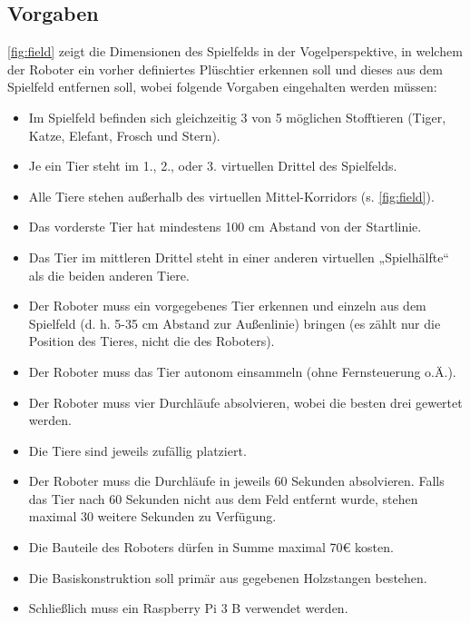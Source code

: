 \subsection{Vorgaben}


\autoref{fig:field} zeigt die Dimensionen des Spielfelds in der Vogelperspektive, in welchem der Roboter ein vorher definiertes Plüschtier erkennen soll und dieses aus dem Spielfeld entfernen soll, wobei folgende Vorgaben eingehalten werden müssen:

\begin{itemize}
    \item Im Spielfeld befinden sich gleichzeitig 3 von 5 möglichen Stofftieren (Tiger, Katze, Elefant, Frosch und Stern).
    \item Je ein Tier steht im 1., 2., oder 3. virtuellen Drittel des Spielfelds.
    \item Alle Tiere stehen außerhalb des virtuellen Mittel-Korridors (s. \autoref{fig:field}).
    \item Das vorderste Tier hat mindestens 100 cm Abstand von der Startlinie.
    \item Das Tier im mittleren Drittel steht in einer anderen virtuellen „Spielhälfte“ als die beiden anderen Tiere.
    \item Der Roboter muss ein vorgegebenes Tier erkennen und einzeln aus dem Spielfeld (d. h. 5-35 cm Abstand zur Außenlinie) bringen (es zählt nur die Position des Tieres, nicht die des Roboters).
    \item Der Roboter muss das Tier autonom einsammeln (ohne Fernsteuerung o.Ä.).
    \item Der Roboter muss vier Durchläufe absolvieren, wobei die besten drei gewertet werden.
    \item Die Tiere sind jeweils zufällig platziert.
    \item Der Roboter muss die Durchläufe in jeweils 60 Sekunden absolvieren. Falls das Tier nach 60 Sekunden nicht aus dem Feld entfernt wurde, stehen maximal 30 weitere Sekunden zu Verfügung.
    \item Die Bauteile des Roboters dürfen in Summe maximal 70€ kosten.
    \item Die Basiskonstruktion soll primär aus gegebenen Holzstangen bestehen.
    \item Schließlich muss ein Raspberry Pi 3 B verwendet werden.
\end{itemize}


